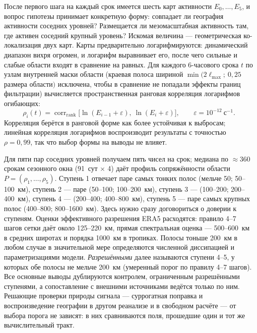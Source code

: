 \documentclass[11pt,a4paper]{article}
\begin{document}
После первого шага на каждый срок имеется шесть карт активности $E_0,\dots,E_5$, и вопрос гипотезы принимает конкретную форму: совпадает ли география активности соседних уровней? Размещается ли мезомасштабная активность там, где активен соседний крупный уровень? Искомая величина --- геометрическая ко-локализация двух карт. Карты предварительно логарифмируются: динамический диапазон вихря огромен, и логарифм выравнивает его, после чего сильные и слабые области входят в сравнение на равных. Для каждого 6-часового срока $t$ по узлам внутренней маски области (краевая полоса шириной $\min(2\ell_{\max};\ 0{,}25$ размера области$)$ исключена, чтобы в сравнение не попадали эффекты границ фильтрации) вычисляется пространственная ранговая корреляция логарифмов огибающих:
\begin{equation}
\label{eq:rho}
\rho_i(t)=\operatorname{corr}_{\mathrm{rank}}\bigl[\ln(E_{i-1}+\varepsilon),\ \ln(E_i+\varepsilon)\bigr],\qquad \varepsilon=10^{-12}\ \text{с}^{-1}.
\end{equation}
Корреляция берётся в ранговой форме как более устойчивая к выбросам; линейная корреляция логарифмов воспроизводит результаты с точностью $\rho=0{,}99$, так что выбор формы на выводы не влияет.

Для пяти пар соседних уровней получаем пять чисел на срок; медиана по ${\approx}360$ срокам сезонного окна (91~сут $\times$ 4) даёт профиль сопряжённости области $P=(\rho_1,\dots,\rho_5)$. Ступень 1 отвечает паре самых тонких полос (мельче 50; 50--100~км), ступень 2 --- паре (50--100; 100--200~км), ступень 3 --- (100--200; 200--400~км), ступень 4 --- (200--400; 400--800~км), ступень 5 --- паре самых крупных полос (400--800; 800--1600~км). Здесь нужно сразу договориться о доверии к ступеням. Оценки эффективного разрешения ERA5 расходятся: правило 4--7 шагов сетки \cite{Skamarock2004} даёт около 125--220~км, прямая спектральная оценка \cite{Bolgiani2022} --- 500--600~км в средних широтах и порядка 1000~км в тропиках. Полосы тоньше 200~км в любом случае в значительной мере определяются численной диссипацией и параметризациями модели. \emph{Разрешёнными} далее называются ступени 4--5, у которых обе полосы не мельче 200~км (умеренный порог по правилу 4--7 шагов). Все основные выводы дублируются контролем, ограниченным разрешёнными ступенями, а сопоставление с внешними источниками ведётся только по ним. Решающие проверки природы сигнала --- суррогатная поправка и воспроизведение географии в другом реанализе и в свободном расчёте --- от выбора порога не зависят: в них сравниваются поля, прошедшие один и тот же вычислительный тракт.
\end{document}
